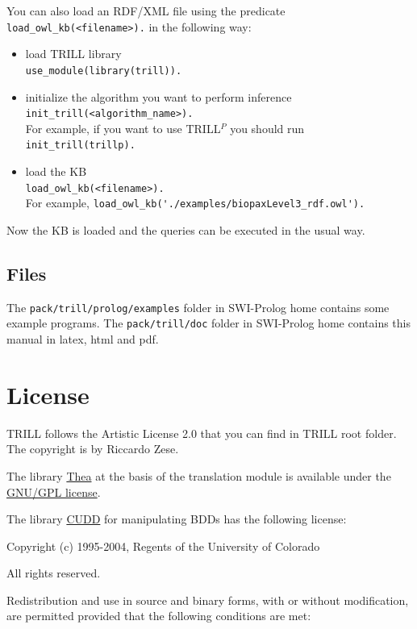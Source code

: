 \documentclass[a4paper,10pt]{scrartcl}
\begin{document}
You can also load an RDF/XML file using the predicate \verb|load_owl_kb(<filename>).| in the following way:
\begin{itemize}
	\item load TRILL library\\
	\verb|use_module(library(trill)).|
	\item initialize the algorithm you want to perform inference\\
	\verb|init_trill(<algorithm_name>).|\\
	For example, if you want to use TRILL$^P$ you should run \verb|init_trill(trillp).|
	\item load the KB\\
	\verb|load_owl_kb(<filename>).|\\
	For example, \verb|load_owl_kb('./examples/biopaxLevel3_rdf.owl').|
\end{itemize}
\noindent
Now the KB is loaded and the queries can be executed in the usual way.

\subsection{Files}
The \texttt{pack/trill/prolog/examples} folder in SWI-Prolog home contains some example programs.
The \texttt{pack/trill/doc} folder in SWI-Prolog home contains this manual in latex, html and pdf.


\section{License}
\label{license}



TRILL follows the Artistic License 2.0 that you can find in TRILL root folder. The copyright is by Riccardo Zese.
\vspace{3mm}

The library \href{http://vangelisv.github.io/thea/}{Thea} at the basis of the translation module is available under the \href{http://www.gnu.org/copyleft/gpl.html}{GNU/GPL license}.

The library \href{http://vlsi.colorado.edu/\string ~fabio/}{CUDD} for manipulating BDDs has the following license:

\vspace{3mm}

Copyright (c) 1995-2004, Regents of the University of Colorado

All rights reserved.

Redistribution and use in source and binary forms, with or without
modification, are permitted provided that the following conditions
are met:
\end{document}
